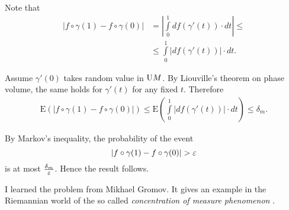 Note that 
\begin{align*}
|f\circ \gamma(1)-f\circ\gamma(0)|
&=
\left|\int\limits_0^1df(\gamma'(t))\cdot dt\right|\le \\
&\le \int\limits_0^1\left|df(\gamma'(t))\right|\cdot dt.
\end{align*}

Assume $\gamma'(0)$
takes random value in $\mathrm{U} M$.
By Liouville's theorem on phase volume, the same holds for $\gamma'(t)$
for any fixed $t$.
Therefore
\begin{align*}
\mathrm{E}(|f\circ \gamma(1)-f\circ\gamma(0)|)\le \mathrm{E}\left(\int\limits_0^1|df(\gamma'(t))|\cdot dt\right)\le\delta_m.
\end{align*}

By Markov's inequality,
the probability of the event 
\[|f\circ \gamma(1)-f\circ\gamma(0)|>\eps\]
is at most $\tfrac{\delta_m}{\varepsilon}$.
Hence the result follows.
\qeds

I learned the problem from Mikhael Gromov.
It gives an example in the Riemannian world
of the so called 
\emph{concentration of measure phenomenon}
\cite[see][]{milman-schechtman,ledoux}.
 
